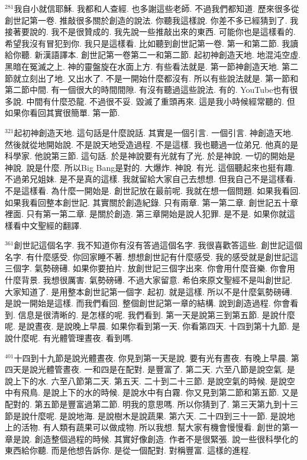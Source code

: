 \documentclass{book}
\begin{document}
$^{281}$我自小就信耶穌.
我都和人查經.
也多謝這些老師.
不過我們都知道.
歷來很多從創世記第一卷.
推敲很多關於創造的說法.
你聽我這樣說.
你差不多已經猜到了.
我接著要說的.
我不是很贊成的.
我先說一些推敲出來的東西.
可能你也是這樣看的.
希望我沒有冒犯到你.
我只是這樣看.
比如聽到創世記第一卷.
第一和第二節.
我讀給你聽.
新漢語譯本.
創世記第一卷第二一和第二節.
起初神創造天地.
地混沌空虛.
黑暗在冤滅之上.
神的靈盤旋在水面上方.
有些看法就是.
第一節神創造天地.
第二節就立刻出了地.
又出水了.
不是一開始什麼都沒有.
所以有些說法就是.
第一節和第二節中間.
有一個很大的時間間隙.
有沒有聽過這些說法.
有的.
YouTube也有很多說.
中間有什麼恐龍.
不過很不妥.
毀滅了重頭再來.
這是我小時候經常聽的.
但如果你看回其實很簡單.
第一節.

$^{321}$起初神創造天地.
這句話是什麼說話.
其實是一個引言.
一個引言.
神創造天地.
然後就從地開始說.
不是說天地受造過程.
不是這樣.
我也聽過一位弟兄.
他真的是科學家.
他說第三節.
這句話.
於是神說要有光就有了光.
於是神說.
一切的開始是神說.
說是什麼.
所以Big Bang是對的.
大爆炸.
神說.
有光.
這個聽起來也挺有趣.
不過弟兄姐妹.
是不是真的這樣.
我就留給大家自己去想想.
但我自己不是這樣看.
不是這樣看.
為什麼一開始是.
創世記放在最前呢.
我就在想一個問題.
如果我看回.
如果我看回整本創世記.
其實關於創造紀錄.
只有兩章.
第一第二章.
創世記五十章裡面.
只有第一第二章.
是關於創造.
第三章開始是說人犯罪.
是不是.
如果你就這樣看中文聖經的翻譯.

$^{361}$創世記這個名字.
我不知道你有沒有答過這個名字.
我很喜歡答這些.
創世記這個名字.
有什麼感受.
你回家睡不著.
想想創世記有什麼感受.
我的感受就是創世記這三個字.
氣勢磅礡.
如果你要拍片.
放創世記三個字出來.
你會用什麼音樂.
你會用什麼背景.
我想很厲害.
氣勢磅礡.
不過大家留意.
希伯來原文聖經不是叫創世記.
大家知道了.
是用整本創世記第一個字.
起初.
就是這樣.
所以不是什麼氣勢磅礡.
是說一開始是這樣.
而我們看回.
整個創世記第一章的結構.
說到創造過程.
你會看到.
信息是很清晰的.
是怎樣的呢.
我們看到.
第一天是說第三到第五節.
是說什麼呢.
是說晝夜.
是說晚上早晨.
如果你看到第一天.
你看第四天.
十四到第十九節.
是說什麼呢.
有光體管理晝夜.
看到嗎.

$^{401}$十四到十九節是說光體晝夜.
你見到第一天是說.
要有光有晝夜.
有晚上早晨.
第四天是說光體管晝夜.
一和四是在配對.
是豐富了.
第二天.
六至八節是說空氣.
是說上下的水.
六至八節第二天.
第五天.
二十到二十三節.
是說空氣的時候.
是說空中有飛鳥.
是說上下的水的時候.
是說水中有白霧.
你又見到第二節和第五節.
又是配對的.
第五節是豐富過第二節.
明我的意思嗎.
所以你猜到了.
第三天第九到十三節是說什麼呢.
是說地海.
是說樹木是說蔬果.
第六天.
二十四到三十一節.
是說地上的活物.
有人類有蔬果可以做成物.
所以我想.
幫大家有機會慢慢看.
創世的第一章是說.
創造整個過程的時候.
其實好像創造.
作者不是很緊張.
說一些很科學化的東西給你聽.
而是他想告訴你.
是從一個配對.
對稱豐富.
這樣的進程.
\end{document}
